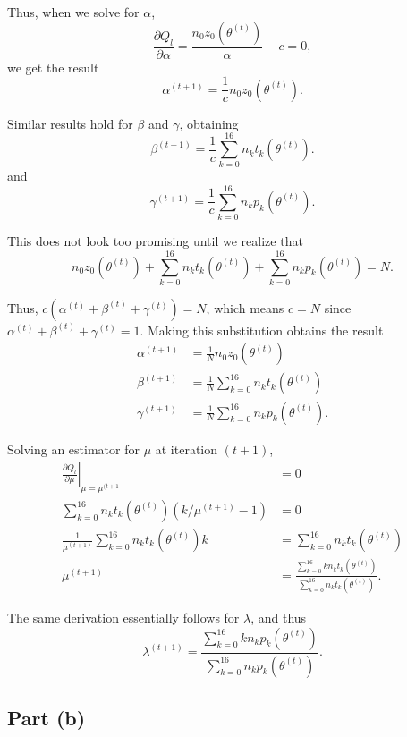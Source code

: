\documentclass[
]{article}
\begin{document}
Thus, when we solve for \(\alpha\), \[
  \frac{\partial Q_l}{\partial \alpha} = \frac{n_0 z_0(\theta^{(t)})}{\alpha} - c = 0,
\] we get the result \[
  \alpha^{(t+1)} = \frac{1}{c} n_0 z_0(\theta^{(t)}).
\]

Similar results hold for \(\beta\) and \(\gamma\), obtaining \[
  \beta^{(t+1)} = \frac{1}{c} \sum_{k=0}^{16} n_k t_k(\theta^{(t)}).
\] and \[
  \gamma^{(t+1)} = \frac{1}{c} \sum_{k=0}^{16} n_k p_k(\theta^{(t)}).
\]

This does not look too promising until we realize that \[
  n_0 z_0(\theta^{(t)}) + \sum_{k=0}^{16} n_k t_k(\theta^{(t)}) + \sum_{k=0}^{16} n_k p_k(\theta^{(t)}) = N.
\]

Thus, \(c (\alpha^{(t)}+\beta^{(t)}+\gamma^{(t)}) = N\), which means
\(c = N\) since \(\alpha^{(t)}+\beta^{(t)}+\gamma^{(t)} = 1\). Making
this substitution obtains the result \begin{align}
  \alpha^{(t+1)}    &= \frac{1}{N} n_0 z_0(\theta^{(t)})\\
  \beta^{(t+1)}     &= \frac{1}{N} \sum_{k=0}^{16} n_k t_k(\theta^{(t)})\\
  \gamma^{(t+1)}    &= \frac{1}{N} \sum_{k=0}^{16} n_k p_k(\theta^{(t)}).
\end{align}

Solving an estimator for \(\mu\) at iteration \((t+1)\), \begin{align}
  \left. \frac{\partial Q_l}{\partial \mu} \right\vert_{\mu=\mu^{(t+1}} &= 0\\
  \sum_{k=0}^{16} n_k t_k(\theta^{(t)})(k/\mu^{(t+1)}-1)           &= 0\\
  \frac{1}{\mu^{(t+1)}} \sum_{k=0}^{16} n_k t_k(\theta^{(t)}) k    &= \sum_{k=0}^{16} n_k t_k(\theta^{(t)})\\
  \mu^{(t+1)} &= \frac{\sum_{k=0}^{16} k n_k t_k(\theta^{(t)})}{\sum_{k=0}^{16} n_k t_k(\theta^{(t)})}.
\end{align}

The same derivation essentially follows for \(\lambda\), and thus \[
  \lambda^{(t+1)} = \frac{\sum_{k=0}^{16} k n_k p_k(\theta^{(t)})}{\sum_{k=0}^{16} n_k p_k(\theta^{(t)})}.
\]

\hypertarget{part-b-1}{%
\subsection{Part (b)}\label{part-b-1}}

\end{document}
